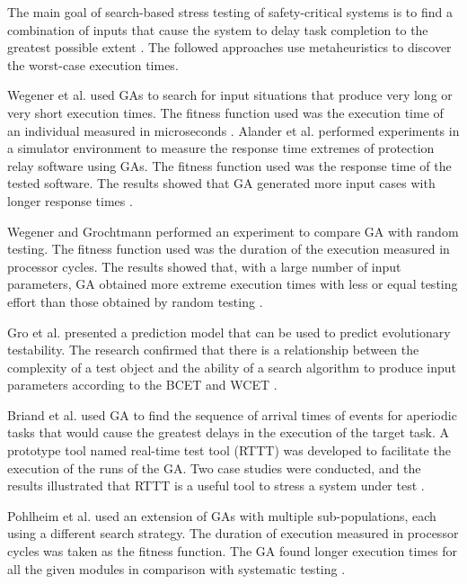 \documentclass{bmcart}
\begin{document}
The main goal of search-based stress testing of safety-critical systems is to find a combination of inputs that cause the system to delay task completion to the greatest possible extent \citep{shousha2003performance}. The followed approaches use metaheuristics to discover the worst-case execution times. 

Wegener et al. \citep{Wegener1997} used GAs to search for input situations that produce very long or very short execution times. The fitness function used was the execution time of an individual measured in microseconds \citep{Wegener1997}. Alander et al. \citep{Alander} performed experiments in a simulator environment to measure the response time extremes of protection relay software using GAs. The fitness function used was the response time of the tested software. The results showed that GA generated more input cases with longer response times \citep{Alander}. 

Wegener and Grochtmann performed an  experiment
to compare GA with random testing. The fitness function used was the duration of the execution measured in processor cycles.  The results showed that, with a large number of input parameters, GA obtained more extreme execution times with less or equal testing effort than those obtained by random testing \citep{J.WegenerK.GrimmM.GrochtmannH.Sthamer1996} \citep{Wegener1998}.


Gro et al. \citep{Gross2000} presented a prediction model  that can be used to predict evolutionary testability. The research confirmed that there is a relationship between the complexity of a test object and the ability of a search algorithm to produce input parameters according to the BCET and WCET \citep{Gross2000}. 

Briand et al. \citep{Briand2005} used GA to find the sequence of arrival times of events for aperiodic tasks that would cause the greatest delays in the execution of the target task. A prototype tool named real-time test tool (RTTT) was developed to facilitate the execution of the runs of the GA. Two case studies were conducted, and the results illustrated that RTTT is a useful tool to stress a system under test \citep{Briand2005}.


Pohlheim et al. used an extension of GAs with multiple sub-populations, each using a different search strategy. The duration of execution measured in processor cycles was taken as the fitness
function. The GA found longer execution times for all the given modules in comparison with systematic testing \citep{Pohlheim2005}.
\end{document}

